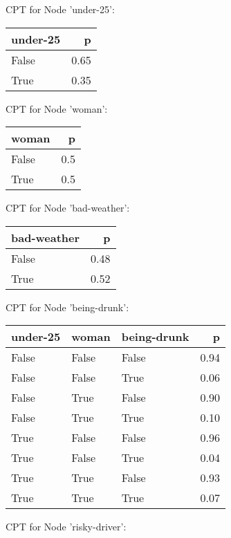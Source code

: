 
CPT for Node 'under-25':

\begin{tabular}{lr}
\toprule
 under-25 &    p \\
\midrule
    False & 0.65 \\
     True & 0.35 \\
\bottomrule
\end{tabular}


CPT for Node 'woman':

\begin{tabular}{lr}
\toprule
 woman &   p \\
\midrule
 False & 0.5 \\
  True & 0.5 \\
\bottomrule
\end{tabular}


CPT for Node 'bad-weather':

\begin{tabular}{lr}
\toprule
 bad-weather &    p \\
\midrule
       False & 0.48 \\
        True & 0.52 \\
\bottomrule
\end{tabular}


CPT for Node 'being-drunk':

\begin{tabular}{lllr}
\toprule
 under-25 &  woman &  being-drunk &    p \\
\midrule
    False &  False &        False & 0.94 \\
    False &  False &         True & 0.06 \\
    False &   True &        False & 0.90 \\
    False &   True &         True & 0.10 \\
     True &  False &        False & 0.96 \\
     True &  False &         True & 0.04 \\
     True &   True &        False & 0.93 \\
     True &   True &         True & 0.07 \\
\bottomrule
\end{tabular}


CPT for Node 'risky-driver':

